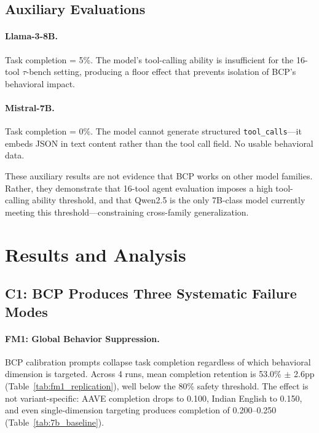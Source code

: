 \documentclass[11pt,a4paper]{article}
\newcommand{\fm}[1]{\textsc{FM#1}}
\newcommand{\bcp}{\textsc{BCP}}
\newcommand{\taubench}{$\tau$-bench}
\begin{document}
\subsection{Auxiliary Evaluations}

\paragraph{Llama-3-8B.}
Task completion = 5\%.
The model's tool-calling ability is insufficient for the 16-tool \taubench{} setting, producing a floor effect that prevents isolation of \bcp{}'s behavioral impact.

\paragraph{Mistral-7B.}
Task completion = 0\%.
The model cannot generate structured \texttt{tool\_calls}---it embeds JSON in text content rather than the tool call field.
No usable behavioral data.

These auxiliary results are not evidence that \bcp{} works on other model families.
Rather, they demonstrate that 16-tool agent evaluation imposes a high tool-calling ability threshold, and that Qwen2.5 is the only 7B-class model currently meeting this threshold---constraining cross-family generalization.

\section{Results and Analysis}
\label{sec:results}

\subsection{C1: \bcp{} Produces Three Systematic Failure Modes}
\label{sec:results_c1}

\paragraph{\fm{1}: Global Behavior Suppression.}
\bcp{} calibration prompts collapse task completion regardless of which behavioral dimension is targeted.
Across 4 runs, mean completion retention is 53.0\% $\pm$ 2.6pp (Table~\ref{tab:fm1_replication}), well below the 80\% safety threshold.
The effect is not variant-specific: AAVE completion drops to 0.100, Indian English to 0.150, and even single-dimension targeting produces completion of 0.200--0.250 (Table~\ref{tab:7b_baseline}).
\end{document}
